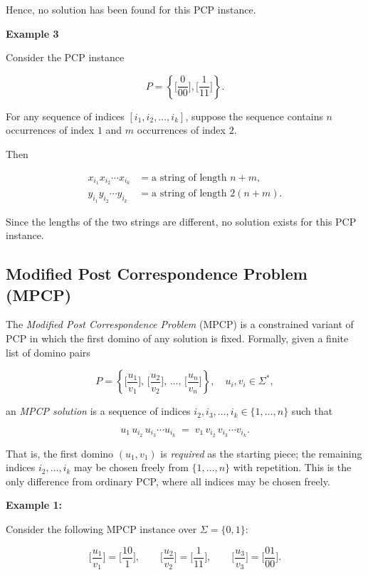 \documentclass[12pt,a4paper,openany]{article}
\begin{document}
Hence, no solution has been found for this PCP instance.

\textbf{Example 3}

Consider the PCP instance

\[
P = \left\{
\bigg[\frac{0}{00}\bigg],
\bigg[\frac{1}{11}\bigg]
\right\}.
\]

For any sequence of indices $[i_1, i_2, \ldots, i_k]$, suppose the sequence contains
$n$ occurrences of index $1$ and $m$ occurrences of index $2$.

Then

\begin{align*}
x_{i_1} x_{i_2} \cdots x_{i_k} &= \text{a string of length } n + m, \\
y_{i_1} y_{i_2} \cdots y_{i_k} &= \text{a string of length } 2(n + m).
\end{align*}

Since the lengths of the two strings are different, no solution exists for this PCP instance.



\subsection{Modified Post Correspondence Problem (MPCP)}

The \emph{Modified Post Correspondence Problem} (MPCP) is a constrained variant of PCP in which
the first domino of any solution is fixed. Formally, given a finite list of domino pairs

\[
P = \left\{ \bigg[\frac{u_1}{v_1}\bigg],\, \bigg[\frac{u_2}{v_2}\bigg],\, \dots,\, \bigg[\frac{u_n}{v_n}\bigg] \right\},
\quad u_i, v_i \in \Sigma^*,
\]

an \emph{MPCP solution} is a sequence of indices $i_2, i_3, \dots, i_k \in \{1, \dots, n\}$ such that

\[
u_1\, u_{i_2}\, u_{i_3} \cdots u_{i_k} \;=\; v_1\, v_{i_2}\, v_{i_3} \cdots v_{i_k}.
\]

That is, the first domino $(u_1, v_1)$ is \emph{required} as the starting piece; the remaining
indices $i_2, \dots, i_k$ may be chosen freely from $\{1, \dots, n\}$ with repetition.
This is the only difference from ordinary PCP, where all indices may be chosen freely.


\textbf{Example 1:}

Consider the following MPCP instance over $\Sigma = \{0, 1\}$:

\[
  \bigg[\frac{u_1}{v_1}\bigg] = \bigg[\frac{10}{1}\bigg],
  \qquad
  \bigg[\frac{u_2}{v_2}\bigg] = \bigg[\frac{1}{11}\bigg],
  \qquad
  \bigg[\frac{u_3}{v_3}\bigg] = \bigg[\frac{01}{00}\bigg].
\]
\end{document}
